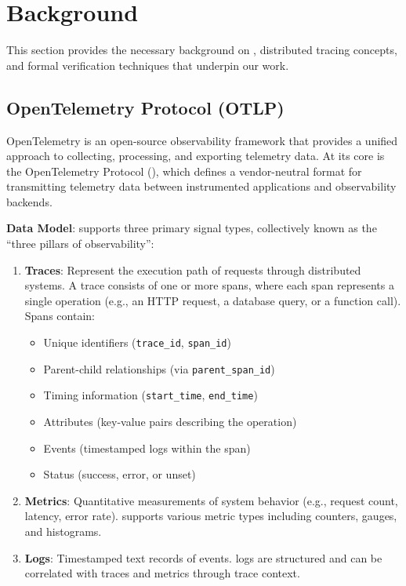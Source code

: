 
\section{Background}
\label{sec:background}

This section provides the necessary background on \otlp, distributed tracing concepts, and formal verification techniques that underpin our work.

\subsection{OpenTelemetry Protocol (OTLP)}
\label{sec:background-otlp}

OpenTelemetry is an open-source observability framework that provides a unified approach to collecting, processing, and exporting telemetry data. At its core is the OpenTelemetry Protocol (\otlp), which defines a vendor-neutral format for transmitting telemetry data between instrumented applications and observability backends.

\textbf{Data Model}: \otlp supports three primary signal types, collectively known as the ``three pillars of observability'':

\begin{enumerate}
\item \textbf{Traces}: Represent the execution path of requests through distributed systems. A trace consists of one or more spans, where each span represents a single operation (e.g., an HTTP request, a database query, or a function call). Spans contain:
   \begin{itemize}
   \item Unique identifiers (\texttt{trace\_id}, \texttt{span\_id})
   \item Parent-child relationships (via \texttt{parent\_span\_id})
   \item Timing information (\texttt{start\_time}, \texttt{end\_time})
   \item Attributes (key-value pairs describing the operation)
   \item Events (timestamped logs within the span)
   \item Status (success, error, or unset)
   \end{itemize}

\item \textbf{Metrics}: Quantitative measurements of system behavior (e.g., request count, latency, error rate). \otlp supports various metric types including counters, gauges, and histograms.

\item \textbf{Logs}: Timestamped text records of events. \otlp logs are structured and can be correlated with traces and metrics through trace context.
\end{enumerate}

